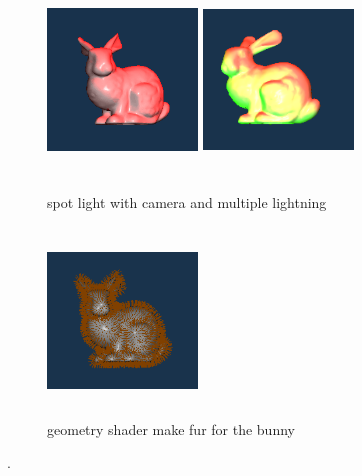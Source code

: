 \documentclass[acmtog]{acmart}
\begin{document}
\begin{figure}[h]
	\centering
	\includegraphics[width=4cm,height=5cm]{r}
	\includegraphics[width=4cm,height=5cm]{r+b}
	\caption{spot light with camera and multiple lightning}
\end{figure}

\begin{figure}[h]
	\centering
	\includegraphics[width=4cm,height=5cm]{ugly}
	\caption{geometry shader make fur for the bunny}
\end{figure}
.
\\
\end{document}
